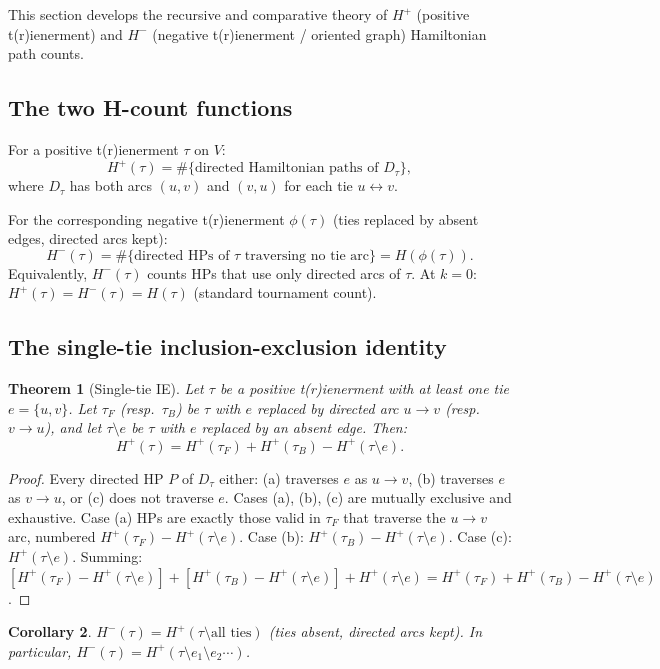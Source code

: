 \documentclass[12pt,reqno]{amsart}
\newtheorem{theorem}{Theorem}[section]
\newtheorem{corollary}[theorem]{Corollary}
\theoremstyle{definition}
\theoremstyle{plain}
\begin{document}
This section develops the recursive and comparative theory of $H^+$ (positive
t(r)ienerment) and $H^-$ (negative t(r)ienerment / oriented graph) Hamiltonian
path counts.

\subsection{The two H-count functions}

For a positive t(r)ienerment $\tau$ on $V$:
\[
  H^+(\tau)=\#\{\text{directed Hamiltonian paths of }D_\tau\},
\]
where $D_\tau$ has both arcs $(u,v)$ and $(v,u)$ for each tie $u\leftrightarrow v$.

For the corresponding negative t(r)ienerment $\phi(\tau)$ (ties replaced by
absent edges, directed arcs kept):
\[
  H^-(\tau)=\#\{\text{directed HPs of }\tau\text{ traversing no tie arc}\}
  =H(\phi(\tau)).
\]
Equivalently, $H^-(\tau)$ counts HPs that use only directed arcs of $\tau$.
At $k=0$: $H^+(\tau)=H^-(\tau)=H(\tau)$ (standard tournament count).

\subsection{The single-tie inclusion-exclusion identity}
\label{ssec:single-tie-ie}

\begin{theorem}[Single-tie IE]\label{thm:single-tie}
Let $\tau$ be a positive t(r)ienerment with at least one tie $e=\{u,v\}$.
Let $\tau_F$ (resp.\ $\tau_B$) be $\tau$ with $e$ replaced by directed arc
$u\to v$ (resp.\ $v\to u$), and let $\tau\setminus e$ be $\tau$ with $e$
replaced by an absent edge.  Then:
\[
  H^+(\tau) = H^+(\tau_F) + H^+(\tau_B) - H^+(\tau\setminus e).
\]
\end{theorem}

\begin{proof}
Every directed HP $P$ of $D_\tau$ either:
(a) traverses $e$ as $u\to v$, (b) traverses $e$ as $v\to u$, or
(c) does not traverse $e$.
Cases (a), (b), (c) are mutually exclusive and exhaustive.
Case (a) HPs are exactly those valid in $\tau_F$ that traverse the $u\to v$ arc,
numbered $H^+(\tau_F)-H^+(\tau\setminus e)$.
Case (b): $H^+(\tau_B)-H^+(\tau\setminus e)$.
Case (c): $H^+(\tau\setminus e)$.
Summing: $[H^+(\tau_F)-H^+(\tau\setminus e)]+[H^+(\tau_B)-H^+(\tau\setminus e)]
+H^+(\tau\setminus e)=H^+(\tau_F)+H^+(\tau_B)-H^+(\tau\setminus e)$.
\end{proof}

\begin{corollary}
$H^-(\tau)=H^+(\tau\setminus\text{all ties})$ (ties absent, directed arcs kept).
In particular, $H^-(\tau)=H^+(\tau\setminus e_1\setminus e_2\cdots)$.
\end{corollary}
\end{document}
